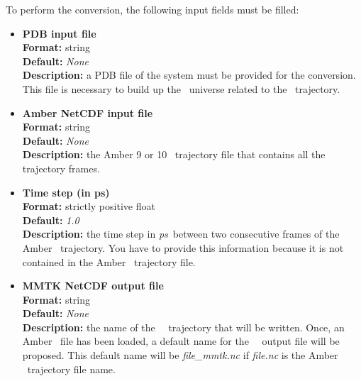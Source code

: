 \documentclass[a4paper,11pt]{report}
\newcommand{\ps}{\textit{ps}}
\begin{document}
To perform the conversion, the following input fields must be filled:
\hypertarget{amber_converter_pdb_input_file}{}
\begin{itemize}
\item \textbf{PDB input file}\\
\textbf{Format:} string\\
\textbf{Default:} \textit{None}\\
\textbf{Description:} a PDB file of the system must be provided for the conversion. This file is necessary to build up the 
\MMTK\ universe related to the \MMTK\ trajectory. 

\hypertarget{amber_converter_netcdf_input_file}{}
\item \textbf{Amber NetCDF input file}\\
\textbf{Format:} string\\
\textbf{Default:} \textit{None}\\
\textbf{Description:} the Amber 9 or 10 \NetCDF\ trajectory file that contains all the trajectory frames.

\hypertarget{amber_converter_time_step}{}
\item \textbf{Time step (in ps)}\\
\textbf{Format:} strictly positive float\\
\textbf{Default:} \textit{1.0}\\
\textbf{Description:} the time step in \ps\ between two consecutive frames of the Amber \NetCDF\ trajectory. You have to provide 
this information because it is not contained in the Amber \NetCDF\ trajectory file.

\hypertarget{amber_converter_mmtk_netcdf_output_file}{}
\item \textbf{MMTK NetCDF output file}\\
\textbf{Format:} string\\
\textbf{Default:} \textit{None}\\
\textbf{Description:} the name of the \MMTK\ \NetCDF\ trajectory that will be written. Once, an Amber \NetCDF\ 
file has been loaded, a default name for the \MMTK\ \NetCDF\ output file will be proposed. This default name will be 
\textit{file\_mmtk.nc} if \textit{file.nc} is the Amber \NetCDF\ trajectory file name.
\end{itemize}
\end{document}
